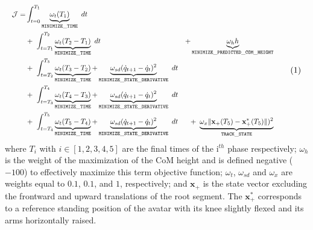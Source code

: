 \[ 
\resizebox{0.9\columnwidth}{!}{$ 
\begin{aligned}
\mathcal{J} = 
  &\int_{t=0}^{T_1}\underbrace{\omega_{t} (T_1)}_{\mathtt{MINIMIZE\_TIME}}~dt\\
  &+~\int_{t=T_1}^{T_2}\underbrace{\omega_{t} (T_2 - T_1)}_{\mathtt{MINIMIZE\_TIME}}~dt &+ \underbrace{\omega_h h}_{\mathtt{MINIMIZE\_PREDICTED\_COM\_HEIGHT}}\\
  &+~\int_{t=T_2}^{T_3}\underbrace{\omega_{t} (T_3 - T_2)}_{\mathtt{MINIMIZE\_TIME}} + \underbrace{\omega_{sd} (\dot{q}_{t+1} - \dot{q}_t)^2}_{\mathtt{MINIMIZE\_STATE\_DERIVATIVE}}~dt\\
  &+~\int_{t=T_3}^{T_4}\underbrace{\omega_{t} (T_4 - T_3)}_{\mathtt{MINIMIZE\_TIME}} + \underbrace{\omega_{sd} (\dot{q}_{t+1} - \dot{q}_t)^2}_{\mathtt{MINIMIZE\_STATE\_DERIVATIVE}}~dt\\
  &+~\int_{t=T_4}^{T_5}\underbrace{\omega_{t} (T_5 - T_4)}_{\mathtt{MINIMIZE\_TIME}} + \underbrace{\omega_{sd} (\dot{q}_{t+1} - \dot{q}_t)^2}_{\mathtt{MINIMIZE\_STATE\_DERIVATIVE}}~dt &+~\underbrace{\omega_{x} \| \mathbf{x}_+(T_5) - \mathbf{x}_+^*(T_5)\| )^2}_{\mathtt{TRACK\_STATE}}\\
\end{aligned} 
$}  
\addtag  
\label{eq:cost_jumper}
\]
where $T_i$ with $i \in [1, 2, 3, 4, 5]$ are the final times of the i$^{th}$ phase respectively; 
$\omega_h$ is the weight of the maximization of the CoM height and is defined negative ($-100$) to effectively maximize this term objective function; 
$\omega_t$, $\omega_{sd}$ and $\omega_x$ are weights equal to $0.1$, $0.1$, and $1$, respectively; 
and $\mathbf{x}_+$ is the state vector excluding the frontward and upward translations of the root segment. 
The $\mathbf{x}_+^*$ corresponds to a reference standing position of the avatar with its knee slightly flexed and its arms horizontally raised.



